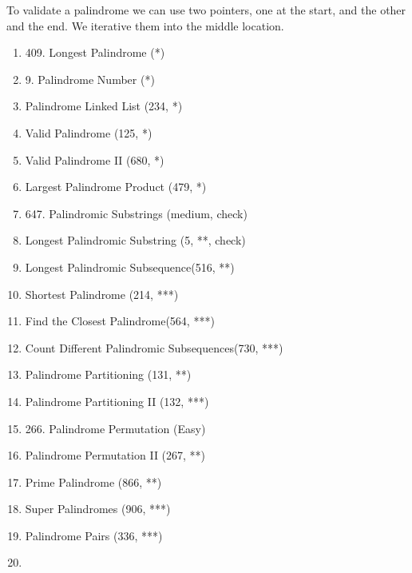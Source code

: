 \documentclass[../main.tex]{subfiles}
\begin{document}
To validate a palindrome we can use two pointers, one at the start, and the other and the end. We iterative them into the middle location. 
\begin{enumerate}

    \item 409. Longest Palindrome (*)
    \item 	9. Palindrome Number (*)
    \item 	Palindrome Linked List (234, *)
    \item Valid Palindrome (125, *)
    \item Valid Palindrome II   (680, *)
    \item Largest Palindrome Product (479, *)
    \item 647. Palindromic Substrings (medium, check)
    \item Longest Palindromic Substring (5, **, check)
    \item Longest Palindromic Subsequence(516, **)
    \item Shortest Palindrome  (214, ***)
    \item Find the Closest Palindrome(564, ***)
    \item Count Different Palindromic Subsequences(730, ***)
    \item Palindrome Partitioning (131, **)
    \item Palindrome Partitioning II (132, ***)

    \item 266. Palindrome Permutation (Easy)
    \item Palindrome Permutation II  (267, **)
    \item Prime Palindrome (866, **)
    \item Super Palindromes (906, ***)
    \item Palindrome Pairs (336, ***)
    \item 
\end{enumerate}
\end{document}
